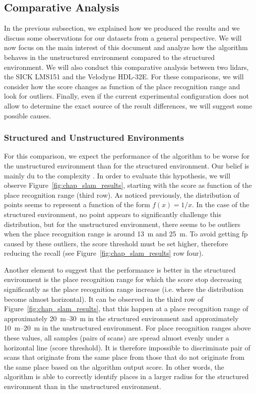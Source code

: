 \subsection{Comparative Analysis}
\label{ssec:chap_slam_comparative_analysis}

In the previous subsection, we explained how we produced the results and we discuss some observations for our datasets from a general perspective. We will now focus on the main interest of this document and analyze how the algorithm behaves in the unstructured environment compared to the structured environment. We will also conduct this comparative analysis between two \gls*{lidar}s, the SICK LMS151 and the Velodyne HDL-32E. For these comparisons, we will consider how the score changes as function of the place recognition range and look for outliers. Finally, even if the current experimental configuration does not allow to determine the exact source of the result differences, we will suggest some possible causes.


\subsubsection{Structured and Unstructured Environments}
\label{ssec:chap_slam_struct_vs_forest}

For this comparison, we expect the performance of the algorithm to be worse for the unstructured environment than for the structured environment. Our belief is mainly du to the complexity . In order to evaluate this hypothesis, we will observe Figure~\ref{fig:chap_slam_results}, starting with the score as function of the place recognition range (third row). As noticed previously, the distribution of points seems to represent a function of the form $f(x) = 1 / x$. In the case of the structured environment, no point appears to significantly challenge this distribution, but for the unstructured environment, there seems to be outliers when the place recognition range is around \SI{13}{\meter} and \SI{25}{\meter}. To avoid getting \gls*{fp} caused by these outliers, the score threshold must be set higher, therefore reducing the recall (see Figure~\ref{fig:chap_slam_results} row four).

Another element to suggest that the performance is better in the structured environment is the place recognition range for which the score stop decreasing significantly as the place recognition range increase (i.e. where the distribution become almost horizontal). It can be observed in the third row of Figure~\ref{fig:chap_slam_results}, that this happen at a place recognition range of approximately \SIrange{20}{30}{\meter} in the structured environment and approximately \SIrange{10}{20}{\meter} in the unstructured environment. For place recognition ranges above these values, all samples (pairs of scans) are spread almost evenly under a horizontal line (score threshold). It is therefore impossible to discriminate pair of scans that originate from the same place from those that do not originate from the same place based on the algorithm output score. In other words, the algorithm is able to correctly identify places in a larger radius for the structured environment than in the unstructured environment.

